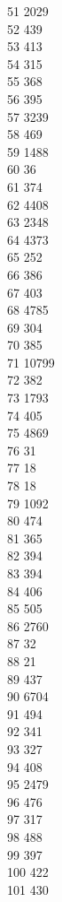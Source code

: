 { 51	2029 \\
 52	439 \\
 53	413 \\
 54	315 \\
 55	368 \\
 56	395 \\
 57	3239 \\
 58	469 \\
 59	1488 \\
 60	36 \\
 61	374 \\
 62	4408 \\
 63	2348 \\
 64	4373 \\
 65	252 \\
 66	386 \\
 67	403 \\
 68	4785 \\
 69	304 \\
 70	385 \\
 71	10799 \\
 72	382 \\
 73	1793 \\
 74	405 \\
 75	4869 \\
 76	31 \\
 77	18 \\
 78	18 \\
 79	1092 \\
 80	474 \\
 81	365 \\
 82	394 \\
 83	394 \\
 84	406 \\
 85	505 \\
 86	2760 \\
 87	32 \\
 88	21 \\
 89	437 \\
 90	6704 \\
 91	494 \\
 92	341 \\
 93	327 \\
 94	408 \\
 95	2479 \\
 96	476 \\
 97	317 \\
 98	488 \\
 99	397 \\
 100	422 \\
 101	430 \\
}
